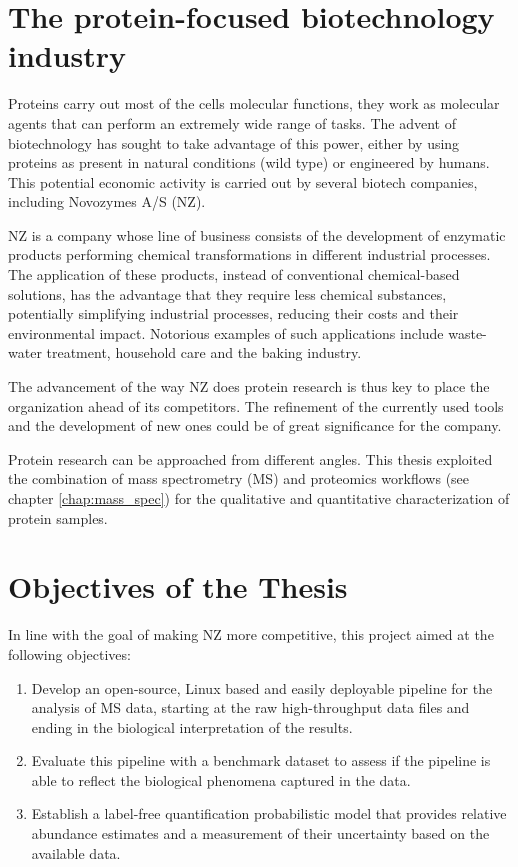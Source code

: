 \section{The protein-focused biotechnology industry}


Proteins carry out most of the cell\textquotesingle s molecular functions, they work as molecular agents that can perform an extremely wide range of tasks. The advent of biotechnology has sought to take advantage of this power, either by using proteins as present in natural conditions (wild type) or engineered by humans. This potential economic activity is carried out by several biotech companies, including Novozymes A/S (NZ).

\ac{NZ} is a company whose line of business consists of the development of enzymatic products performing chemical transformations in different industrial processes. The application of these products, instead of conventional chemical-based solutions, has the advantage that they require less chemical substances, potentially simplifying industrial processes, reducing their costs and their environmental impact. Notorious examples of such applications include waste-water treatment, household care and the baking industry.


The advancement of the way \ac{NZ} does protein research is thus key to place the organization ahead of its competitors. The refinement of the currently used tools and the development of new ones could be of great significance for the company. 

Protein research can be approached from different angles. This thesis exploited the combination of mass spectrometry (\ac{MS}) and proteomics workflows (see chapter \ref{chap:mass_spec}) for the qualitative and quantitative characterization of protein samples.



\section{Objectives of the Thesis}
\label{sec:objectives}

In line with the goal of making \ac{NZ} more competitive, this project aimed at the following objectives:

\begin{enumerate}

\item Develop an open-source, Linux based and easily deployable pipeline for the analysis of \ac{MS} data, starting at the raw high-throughput data files and ending in the  biological interpretation of the results.

\item Evaluate this pipeline with a benchmark dataset to assess if the pipeline is able to reflect the biological phenomena captured in the data.

\item Establish a label-free quantification probabilistic model that provides relative abundance estimates and a measurement of their uncertainty based on the available data.

\end{enumerate}

